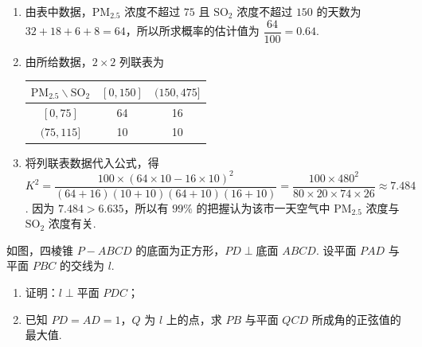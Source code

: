 \begin{solution}
\begin{enumerate}
\item 由表中数据，\(\mathrm{PM}_{2.5}\) 浓度不超过 \(75\) 且 \(\mathrm{SO}_2\) 浓度不超过 \(150\) 的天数为 \(32+18+6+8=64\)，所以所求概率的估计值为 \(\dfrac{64}{100}=0.64\).
\item 由所给数据，\(2\times2\) 列联表为

\begin{center}
\begin{tabular}{c|cc}
\(\mathrm{PM}_{2.5}\backslash\mathrm{SO}_2\) & \([0,150]\) & \((150,475]\) \\
\hline
\([0,75]\) & 64 & 16 \\
\((75,115]\) & 10 & 10
\end{tabular}
\end{center}

\item 将列联表数据代入公式，得 \(K^2=\dfrac{100\times(64\times10-16\times10)^2}{(64+16)(10+10)(64+10)(16+10)}=\dfrac{100\times480^2}{80\times20\times74\times26}\approx7.484\). 因为 \(7.484>6.635\)，所以有 \(99\%\) 的把握认为该市一天空气中 \(\mathrm{PM}_{2.5}\) 浓度与 \(\mathrm{SO}_2\) 浓度有关.
\end{enumerate}
\end{solution}

\begin{problem}
如图，四棱锥 \(P-ABCD\) 的底面为正方形，\(PD\perp\)底面 \(ABCD\). 设平面 \(PAD\) 与平面 \(PBC\) 的交线为 \(l\).

\begin{enumerate}
\item 证明：\(l\perp\)平面 \(PDC\)；
\item 已知 \(PD=AD=1\)，\(Q\) 为 \(l\) 上的点，求 \(PB\) 与平面 \(QCD\) 所成角的正弦值的最大值.
\end{enumerate}

\end{problem}

